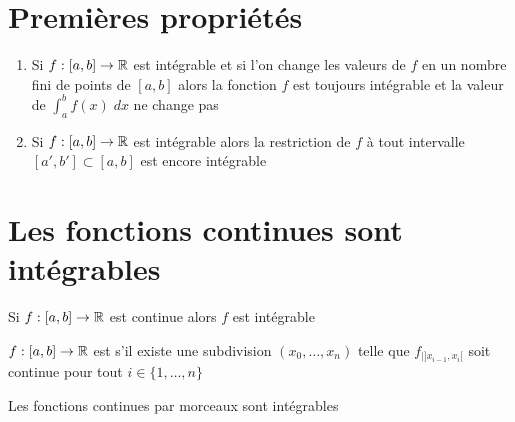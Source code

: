 \section*{Premières propriétés}


\begin{frame}
\begin{proposition}
\label{prop:intprop}
\begin{enumerate}
  \item Si $f : [a,b] \to \mathbb{R}$ est intégrable et si l'on change les valeurs de $f$
en un nombre fini de points de $[a,b]$ alors la fonction $f$ est 
toujours intégrable et la valeur de $\int_a^b f(x)\; dx$ ne change pas

\pause

  \item Si $f  : [a,b] \to \mathbb{R}$ est intégrable alors la restriction de $f$
à tout intervalle $[a',b'] \subset [a,b]$ est encore intégrable
\end{enumerate}
\end{proposition}
\end{frame}




\section*{Les fonctions continues sont intégrables}


\begin{frame}

\begin{theoreme}
\label{th:continueintegrable}
Si $f : [a,b] \to \mathbb{R}$ est continue alors $f$ est intégrable
\end{theoreme}

\pause
\medskip

$f : [a,b] \to \mathbb{R}$ est  s'il existe 
une subdivision $(x_0,\ldots,x_n)$ telle que $f_{|]x_{i-1},x_i[}$ soit continue pour tout 
$i \in \{ 1,\ldots,n \}$


\pause
\vspace*{-5mm}
\begin{corollaire}
Les fonctions continues par morceaux sont intégrables
\end{corollaire}

\end{frame}




